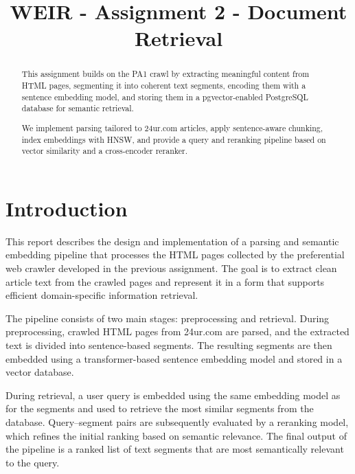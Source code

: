 \documentclass[conference]{IEEEtran}
\begin{document}
\title{WEIR - Assignment 2 - Document Retrieval}



\author{

}

\maketitle

\begin{abstract}
This assignment builds on the PA1 crawl by extracting meaningful content from HTML pages, segmenting it into coherent text segments, encoding them with a sentence embedding model, and storing them in a pgvector-enabled PostgreSQL database for semantic retrieval.

We implement parsing tailored to 24ur.com articles, apply sentence-aware chunking, index embeddings with HNSW, and provide a query and reranking pipeline based on vector similarity and a cross-encoder reranker.
\end{abstract}

\IEEEpeerreviewmaketitle





\section{Introduction}
This report describes the design and implementation of a parsing and semantic embedding
pipeline that processes the HTML pages collected by the preferential web crawler developed
in the previous assignment. The goal is to extract clean article text from the crawled
pages and represent it in a form that supports efficient domain-specific information retrieval.

The pipeline consists of two main stages: preprocessing and retrieval. During preprocessing, crawled HTML pages from 24ur.com are parsed, and the extracted text is divided into sentence-based segments. The resulting segments are then embedded using a transformer-based sentence embedding model and stored in a vector database.

During retrieval, a user query is embedded using the same embedding model as for the segments and used to retrieve the most similar segments from the database. Query--segment pairs are subsequently evaluated by a reranking model, which refines the initial ranking based on semantic relevance. The final output of the pipeline is a ranked list of text segments that are most semantically relevant to the query.
\end{document}
